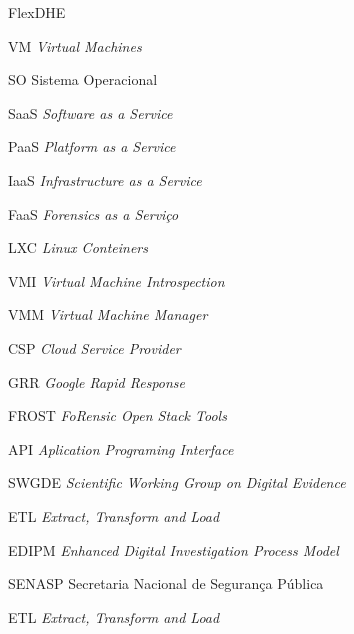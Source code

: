 \documentclass[a4paper,capchap,espacoduplo,normaltoc]{abntepusp}
\newcommand{\hash}{\mathcal{H}}
\newcommand{\bigO}{\mathcal{O}}
\begin{document}
\begin{listofabbrv}{FlexDHE}
    \item [VM] \textit{Virtual Machines}
    \item [SO] Sistema Operacional
    \item [SaaS] \textit{Software as a Service}
    \item [PaaS] \textit{Platform as a Service}
    \item [IaaS] \textit{Infrastructure as a Service}
    \item [FaaS] \textit{Forensics as a Serviço}
    \item [LXC] \textit{Linux Conteiners}
    \item [VMI] \textit{Virtual Machine Introspection}
    \item [VMM] \textit{Virtual Machine Manager}
    \item [CSP] \textit{Cloud Service Provider}
    \item [GRR] \textit{Google Rapid Response}
    \item [FROST] \textit{FoRensic Open Stack Tools} 
    \item [API] \textit{Aplication Programing Interface}
    \item [SWGDE] \textit{Scientific Working Group on Digital Evidence}
    \item [ETL] \textit{Extract, Transform and Load}
    \item [EDIPM] \textit{Enhanced Digital Investigation Process Model}
    \item [SENASP] Secretaria Nacional de Segurança Pública
    \item [ETL] \textit{Extract, Transform and Load}
\end{listofabbrv}



\tableofcontents










\appendix

%
\end{document}
